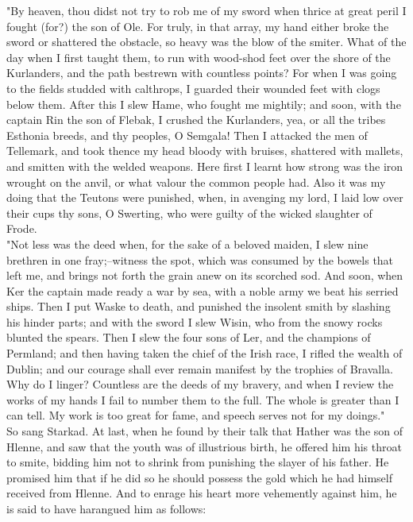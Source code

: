 \documentclass[10pt,a4paper]{report}
\begin{document}
"By heaven, thou didst not try to rob me of my sword when thrice at great peril I fought (for?) the son of Ole. For truly, in that array, my hand either broke the sword or shattered the obstacle, so heavy was the blow of the smiter. What of the day when I first taught them, to run with wood-shod feet over the shore of the Kurlanders, and the path bestrewn with countless points? For when I was going to the fields studded with calthrops, I guarded their wounded feet with clogs below them. After this I slew Hame, who fought me mightily; and soon, with the captain Rin the son of Flebak, I crushed the Kurlanders, yea, or all the tribes Esthonia breeds, and thy peoples, O Semgala! Then I attacked the men of Tellemark, and took thence my head bloody with bruises, shattered with mallets, and smitten with the welded weapons. Here first I learnt how strong was the iron wrought on the anvil, or what valour the common people had. Also it was my doing that the Teutons were punished, when, in avenging my lord, I laid low over their cups thy sons, O Swerting, who were guilty of the wicked slaughter of Frode.\\

"Not less was the deed when, for the sake of a beloved maiden, I slew nine brethren in one fray;--witness the spot, which was consumed by the bowels that left me, and brings not forth the grain anew on its scorched sod. And soon, when Ker the captain made ready a war by sea, with a noble army we beat his serried ships. Then I put Waske to death, and punished the insolent smith by slashing his hinder parts; and with the sword I slew Wisin, who from the snowy rocks blunted the spears. Then I slew the four sons of Ler, and the champions of Permland; and then having taken the chief of the Irish race, I rifled the wealth of Dublin; and our courage shall ever remain manifest by the trophies of Bravalla. Why do I linger? Countless are the deeds of my bravery, and when I review the works of my hands I fail to number them to the full. The whole is greater than I can tell. My work is too great for fame, and speech serves not for my doings."\\

So sang Starkad. At last, when he found by their talk that Hather was the son of Hlenne, and saw that the youth was of illustrious birth, he offered him his throat to smite, bidding him not to shrink from punishing the slayer of his father. He promised him that if he did so he should possess the gold which he had himself received from Hlenne. And to enrage his heart more vehemently against him, he is said to have harangued him as follows:\\
\end{document}
